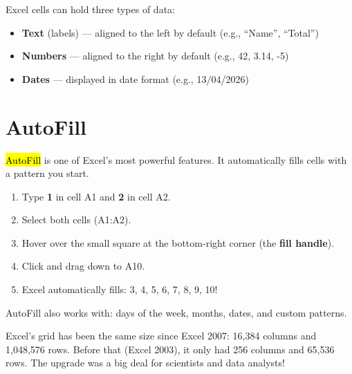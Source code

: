 Excel cells can hold three types of data:
\begin{itemize}[leftmargin=*, label={\textcolor{ModuleBlue}{\faAngleRight}}, itemsep=3pt]
  \item \textbf{Text} (labels) --- aligned to the left by default (e.g., ``Name'', ``Total'')
  \item \textbf{Numbers} --- aligned to the right by default (e.g., 42, 3.14, -5)
  \item \textbf{Dates} --- displayed in date format (e.g., 13/04/2026)
\end{itemize}

\section{AutoFill}
\label{sec:autofill}

\hl{AutoFill} is one of Excel's most powerful features. It automatically fills cells with a pattern you start.

\begin{labstep}
\begin{enumerate}[label=\protect\stepcircle{\arabic*}, leftmargin=2cm, itemsep=3pt]
  \item Type \textbf{1} in cell A1 and \textbf{2} in cell A2.
  \item Select both cells (A1:A2).
  \item Hover over the small square at the bottom-right corner (the \textbf{fill handle}).
  \item Click and drag down to A10.
  \item Excel automatically fills: 3, 4, 5, 6, 7, 8, 9, 10!
\end{enumerate}
\end{labstep}

AutoFill also works with: days of the week, months, dates, and custom patterns.


\begin{funfact}
Excel's grid has been the same size since Excel 2007: 16,384 columns and 1,048,576 rows. Before that (Excel 2003), it only had 256 columns and 65,536 rows. The upgrade was a big deal for scientists and data analysts!
\end{funfact}

